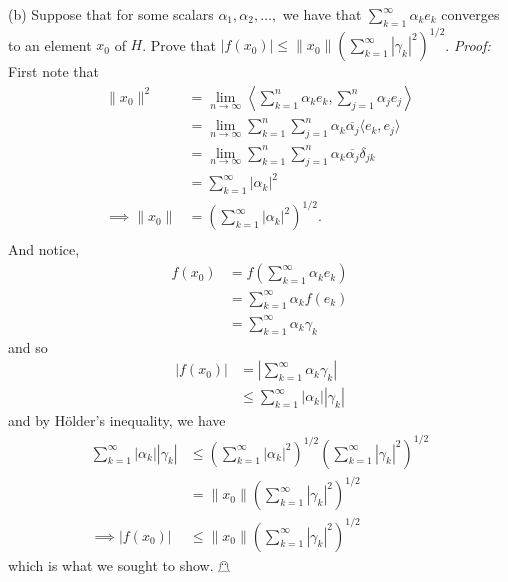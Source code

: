 \documentclass{article}
\begin{document}
\begin{itemize}
    (b) Suppose that for some scalars $\alpha_1, \alpha_2, \dots,$ we have that $\sum_{k = 1}^{\infty}\alpha_k e_k$ converges to an element $x_0$ of $H$. Prove that $|f(x_0)| \leq \|x_0\|(\sum_{k = 1}^{\infty} |\gamma_k|^2)^{1/2}$.
    \newline\newline
    \textit{Proof:} First note that
    \begin{align*}
        \|x_0\|^2 &=\lim_{n \to \infty} \left\langle \sum_{k = 1}^{n}\alpha_ke_k, \sum_{j = 1}^{n} \alpha_je_j \right\rangle\\
        &= \lim_{n \to \infty} \sum_{k = 1}^{n}\sum_{j = 1}^{n} \alpha_k\overline{\alpha_j}\langle e_k,e_j \rangle \\
        &= \lim_{n \to \infty} \sum_{k = 1}^{n}\sum_{j = 1}^{n} \alpha_k\overline{\alpha_j}\delta_{jk}\\
        &= \sum_{k = 1}^{\infty} |\alpha_k|^2\\
        \implies \|x_0\| &= \left(\sum_{k = 1}^{\infty} |\alpha_k|^2\right)^{1/2}.\\
    \end{align*}
    And notice, 
    \begin{align*}
        f(x_0) &= f\left(\sum_{k = 1}^{\infty} \alpha_ke_k\right)\\
        &= \sum_{k = 1}^{\infty} \alpha_kf(e_k)\\
        &= \sum_{k = 1}^{\infty} \alpha_k\gamma_k
    \end{align*}
    and so
    \begin{align*}
        |f(x_0)| &= \left|\sum_{k = 1}^{\infty}\alpha_k\gamma_k\right|\\
        &\leq \sum_{k = 1}^{\infty} |\alpha_k| |\gamma_k|
    \end{align*}
    and by H{\"o}lder's inequality, we have
    \begin{align*}
        \sum_{k = 1}^{\infty} |\alpha_k| |\gamma_k| &\leq \left(\sum_{k = 1}^{\infty}|\alpha_k|^2\right)^{1/2}\left(\sum_{k = 1}^{\infty}|\gamma_k|^2\right)^{1/2}\\
        &= \|x_0\|\left(\sum_{k = 1}^{\infty} |\gamma_k|^2\right)^{1/2}\\
        \implies |f(x_0)| &\leq \|x_0\|\left(\sum_{k = 1}^{\infty} |\gamma_k|^2\right)^{1/2}
    \end{align*}
    which is what we sought to show. \hfill $\mathghost$
    \pagebreak


\end{itemize}
\end{document}
